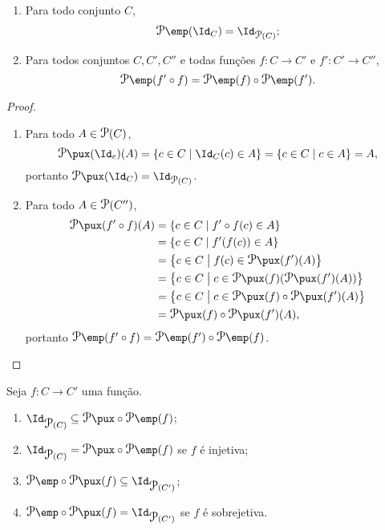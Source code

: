 \begin{prop}
	\begin{enumerate}
	\item Para todo conjunto $C$,
		\begin{equation*}
		\p\emp(\Id_C) = \Id_{\begin{footnotesize}\p\end{footnotesize}(C)};
		\end{equation*}
	\item Para todos conjuntos $C,C',C''$ e todas funções $f\colon C \to C'$ e $f'\colon C' \to C''$,
		\begin{equation*}
		\p\emp(f' \circ f) = \p\emp(f) \circ \p\emp(f').
		\end{equation*}
	\end{enumerate}
\end{prop}
\begin{proof}
	\begin{enumerate}
	\item Para todo $A \in \p(C)$,
		\begin{equation*}
		\p\pux(\Id_c)(A) = \set{c \in C}{\Id_C(c) \in A} = \set{c \in C}{c \in A} = A,
		\end{equation*}
portanto $\p\pux(\Id_C) = \Id_{\begin{footnotesize}\p\end{footnotesize}(C)}$.

	\item Para todo $A \in \p(C'')$,
		\begin{align*}
		\p\pux(f' \circ f)(A) &= \set{c \in C}{f' \circ f(c) \in A} \\
			&= \set{c \in C}{f'(f(c)) \in A} \\
			&= \set{c \in C}{f(c) \in \p\pux(f')(A)} \\
			&= \set{c \in C}{c \in \p\pux(f)(\p\pux(f')(A))} \\
			&= \set{c \in C}{c \in \p\pux(f) \circ \p\pux(f')(A)} \\
			&= \p\pux(f) \circ \p\pux(f')(A),
		\end{align*}
portanto $\p\emp(f' \circ f) = \p\emp(f') \circ \p\emp(f)$.
	\end{enumerate}
\end{proof}

\begin{prop}
Seja $f\colon C \to C'$ uma função.
	\begin{enumerate}
	\item $\Id_{\p(C)} \subseteq \p\pux \circ \p\emp(f)$;
	\item $\Id_{\p(C)} = \p\pux \circ \p\emp(f)$ se $f$ é injetiva;
	\item $\p\emp \circ \p\pux(f) \subseteq \Id_{\p(C')}$;
	\item $\p\emp \circ \p\pux(f) = \Id_{\p(C')}$ se $f$ é sobrejetiva.
	\end{enumerate}
\end{prop}



